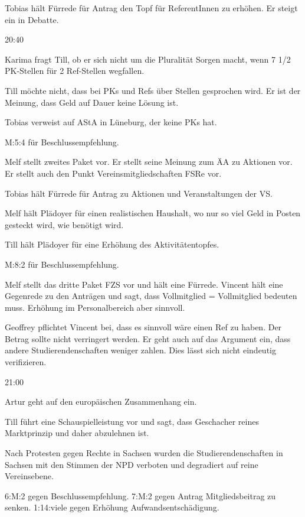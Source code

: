 \documentclass[ngerman,headheight=70pt]{scrartcl}
\begin{document}
    Tobias hält Fürrede für Antrag den Topf für ReferentInnen zu erhöhen. Er
    steigt ein in Debatte.

    20:40

    Karima fragt Till, ob er sich nicht um die Pluralität Sorgen macht, wenn
    7 1/2 PK-Stellen für 2 Ref-Stellen wegfallen.

    Till möchte nicht, dass bei PKs und Refs über Stellen gesprochen wird.
    Er ist der Meinung, dass Geld auf Dauer keine Lösung ist.

    Tobias verweist auf AStA in Lüneburg, der keine PKs hat.

    M:5:4 für Beschlussempfehlung.

    Melf stellt zweites Paket vor. Er stellt seine Meinung zum ÄA zu Aktionen
    vor. Er stellt auch den Punkt Vereinsmitgliedschaften FSRe vor.

    Tobias hält Fürrede für Antrag zu Aktionen und Veranstaltungen der VS.

    Melf hält Plädoyer für einen realistischen Haushalt, wo nur so viel
    Geld in Posten gesteckt wird, wie benötigt wird.

    Till hält Plädoyer für eine Erhöhung des Aktivitätentopfes.

    M:8:2 für Beschlussempfehlung.

    Melf stellt das dritte Paket FZS vor und hält eine Fürrede. Vincent hält
    eine Gegenrede zu den Anträgen und sagt, dass Vollmitglied = Vollmitglied
    bedeuten muss. Erhöhung im Personalbereich aber sinnvoll.

    Geoffrey pflichtet Vincent bei, dass es sinnvoll wäre einen Ref zu haben.
    Der Betrag sollte nicht verringert werden. Er geht auch auf das Argument ein,
    dass andere Studierendenschaften weniger zahlen. Dies lässt sich nicht
    eindeutig verifizieren.

    21:00

    Artur geht auf den europäischen Zusammenhang ein.

    Till führt eine Schauspielleistung vor und sagt, dass Geschacher reines
    Marktprinzip und daher abzulehnen ist.

    Nach Protesten gegen Rechte in Sachsen wurden die Studierendenschaften
    in Sachsen mit den Stimmen der NPD verboten und degradiert auf reine
    Vereinsebene.

    6:M:2 gegen Beschlussempfehlung.
    7:M:2 gegen Antrag Mitgliedsbeitrag zu senken.
    1:14:viele gegen Erhöhung Aufwandsentschädigung.
\end{document}
